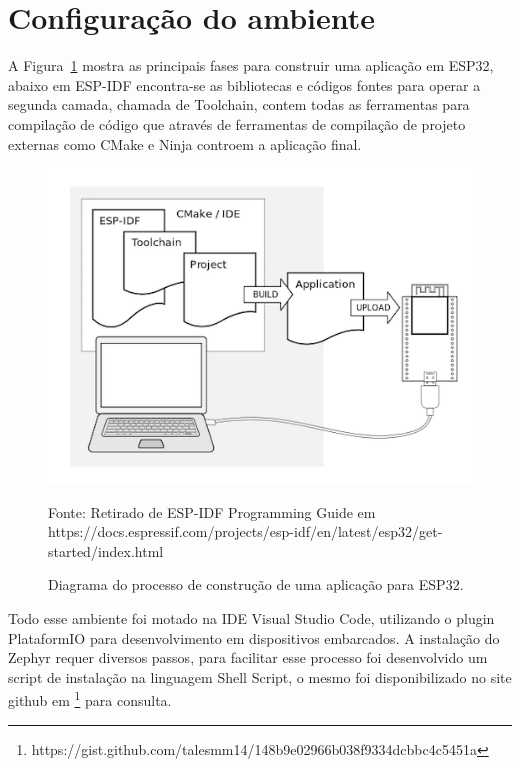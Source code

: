 
\section{Configuração do ambiente}


A Figura~\ref{fig: ESP-IDF Software} mostra as principais fases para construir uma aplicação em 
ESP32, abaixo em ESP-IDF encontra-se as bibliotecas e códigos fontes para operar a segunda camada, 
chamada de Toolchain, contem todas as ferramentas para compilação de código que através de ferramentas 
de compilação de projeto externas como CMake e Ninja controem a aplicação final.

\begin{figure}[H]
	\centering
	\includegraphics[width=15cm]{imagens/what-you-need.png}
	\caption{Diagrama do processo de construção de uma aplicação para ESP32.}
	Fonte: Retirado de ESP-IDF Programming Guide em https://docs.espressif.com/projects/esp-idf/en/latest/esp32/get-started/index.html
	\label{fig: ESP-IDF Software}
\end{figure}

Todo esse ambiente foi motado na IDE Visual Studio Code, utilizando o plugin PlataformIO para 
desenvolvimento em dispositivos embarcados. A instalação do Zephyr requer diversos passos, para 
facilitar esse processo foi desenvolvido um script de instalação na linguagem Shell Script, o mesmo 
foi disponibilizado no site github em 
\footnote{https://gist.github.com/talesmm14/148b9e02966b038f9334dcbbc4c5451a} para consulta.


